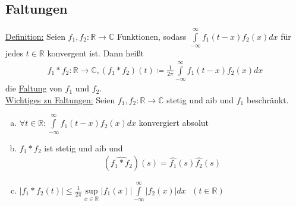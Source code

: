 \subsection{Faltungen}
\underline{Definition:} Seien $f_1,f_2: \mathbb{R} \to \mathbb{C}$ Funktionen, sodass $\int \limits_{-\infty}^\infty f_1(t-x)f_2(x)dx$ für jedes $t \in \mathbb{R}$ konvergent ist. Dann heißt
\begin{align*}
    f_1 * f_2: \mathbb{R} \to \mathbb{C}, (f_1*f_2)(t) \coloneqq \frac{1}{2\pi} \int \limits_{-\infty}^\infty f_1(t-x)f_2(x)dx
\end{align*}
die \underline{Faltung} von $f_1$ und $f_2$. \\
\underline{Wichtiges zu Faltungen:} Seien $f_1,f_2: \mathbb{R} \to \mathbb{C}$ stetig und aib und $f_1$ beschränkt.
\begin{enumerate} [a)]
    \item $\forall t \in \mathbb{R}: \int \limits_{-\infty}^\infty f_1(t-x)f_2(x)dx$ konvergiert absolut
    \item $f_1*f_2$ ist stetig und aib und
    \begin{align*}
        (\widehat{f_1*f_2})(s) = \widehat{f_1}(s) \widehat{f_2}(s)
    \end{align*}
    \item $\lvert f_1*f_2(t)\rvert \leq \frac{1}{2\pi} \sup \limits_{x \in \mathbb{R}} \lvert f_1(x)\rvert \int \limits_{-\infty}^\infty \lvert f_2(x)\rvert dx \text{ } (t \in \mathbb{R})$
\end{enumerate}


